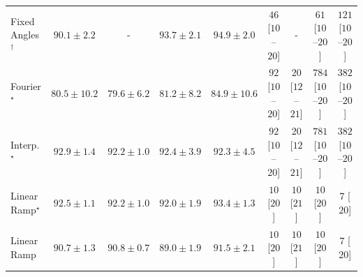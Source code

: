 \begin{tabular}{l|cccc|cccc|}
Fixed Angles$^\dagger$ & {\cellcolor[HTML]{04598C}} \color[HTML]{F1F1F1} $90.1\pm 2.2$ & {\cellcolor[HTML]{000000}} \color[HTML]{F1F1F1} {\cellcolor{white}} \color{black} - & {\cellcolor[HTML]{034267}} \color[HTML]{F1F1F1} $93.7\pm 2.1$ & {\cellcolor[HTML]{023A5B}} \color[HTML]{F1F1F1} $94.9\pm 2.0$ & {\cellcolor[HTML]{FEEDE9}} \color[HTML]{000000} $46$ [$10$--$20$] & {\cellcolor[HTML]{000000}} \color[HTML]{F1F1F1} {\cellcolor{white}} \color{black} - & {\cellcolor[HTML]{FEE9E6}} \color[HTML]{000000} $61$ [$10$--$20$] & {\cellcolor[HTML]{FDDBD7}} \color[HTML]{000000} $121$ [$10$--$20$] \\
Fourier$^\star$ & {\cellcolor[HTML]{2A88BC}} \color[HTML]{F1F1F1} $80.5\pm 10.2$ & {\cellcolor[HTML]{348EBF}} \color[HTML]{F1F1F1} $79.6\pm 6.2$ & {\cellcolor[HTML]{2484BA}} \color[HTML]{F1F1F1} $81.2\pm 8.2$ & {\cellcolor[HTML]{056FAE}} \color[HTML]{F1F1F1} $84.9\pm 10.6$ & {\cellcolor[HTML]{FDE2DF}} \color[HTML]{000000} $92$ [$10$--$20$] & {\cellcolor[HTML]{FFF3F0}} \color[HTML]{000000} $20$ [$12$--$21$] & {\cellcolor[HTML]{49006A}} \color[HTML]{F1F1F1} $784$ [$10$--$20$] & {\cellcolor[HTML]{F76EA3}} \color[HTML]{F1F1F1} $382$ [$10$--$20$] \\
Interp.$^\star$ & {\cellcolor[HTML]{03476F}} \color[HTML]{F1F1F1} $92.9\pm 1.4$ & {\cellcolor[HTML]{034B76}} \color[HTML]{F1F1F1} $92.2\pm 1.0$ & {\cellcolor[HTML]{034A74}} \color[HTML]{F1F1F1} $92.4\pm 3.9$ & {\cellcolor[HTML]{034B76}} \color[HTML]{F1F1F1} $92.3\pm 4.5$ & {\cellcolor[HTML]{FDE2DF}} \color[HTML]{000000} $92$ [$10$--$20$] & {\cellcolor[HTML]{FFF3F0}} \color[HTML]{000000} $20$ [$12$--$21$] & {\cellcolor[HTML]{49006A}} \color[HTML]{F1F1F1} $781$ [$10$--$20$] & {\cellcolor[HTML]{F76EA3}} \color[HTML]{F1F1F1} $382$ [$10$--$20$] \\
Linear Ramp$^\star$ & {\cellcolor[HTML]{034973}} \color[HTML]{F1F1F1} $92.5\pm 1.1$ & {\cellcolor[HTML]{034B76}} \color[HTML]{F1F1F1} $92.2\pm 1.0$ & {\cellcolor[HTML]{034C78}} \color[HTML]{F1F1F1} $92.0\pm 1.9$ & {\cellcolor[HTML]{03446A}} \color[HTML]{F1F1F1} $93.4\pm 1.3$ & {\cellcolor[HTML]{FFF6F2}} \color[HTML]{000000} $10$ [$20$] & {\cellcolor[HTML]{FFF6F2}} \color[HTML]{000000} $10$ [$21$] & {\cellcolor[HTML]{FFF6F2}} \color[HTML]{000000} $10$ [$20$] & {\cellcolor[HTML]{FFF6F2}} \color[HTML]{000000} $7$ [$20$] \\
Linear Ramp & {\cellcolor[HTML]{045585}} \color[HTML]{F1F1F1} $90.7\pm 1.3$ & {\cellcolor[HTML]{045585}} \color[HTML]{F1F1F1} $90.8\pm 0.7$ & {\cellcolor[HTML]{045E93}} \color[HTML]{F1F1F1} $89.0\pm 1.9$ & {\cellcolor[HTML]{034F7D}} \color[HTML]{F1F1F1} $91.5\pm 2.1$ & {\cellcolor[HTML]{FFF6F2}} \color[HTML]{000000} $10$ [$20$] & {\cellcolor[HTML]{FFF6F2}} \color[HTML]{000000} $10$ [$21$] & {\cellcolor[HTML]{FFF6F2}} \color[HTML]{000000} $10$ [$20$] & {\cellcolor[HTML]{FFF6F2}} \color[HTML]{000000} $7$ [$20$] \\

\end{tabular}
